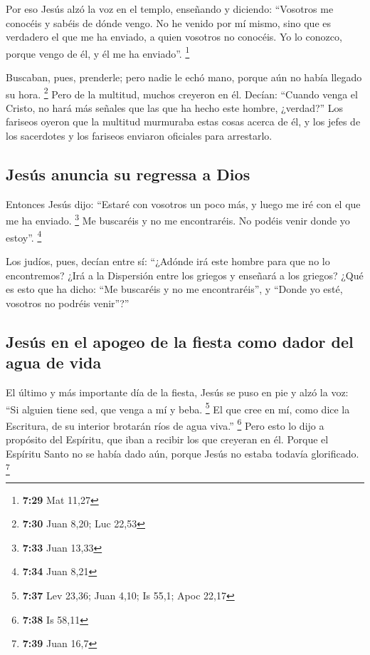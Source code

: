 \begin{paracol}{2}
 Por eso Jesús alzó la voz en el templo, enseñando y
diciendo: ``Vosotros me conocéis y sabéis de dónde vengo. No he venido
por mí mismo, sino que es verdadero el que me ha enviado, a quien
vosotros no conocéis.  Yo lo conozco, porque vengo de él,
y él me ha enviado''. \footnote{\textbf{7:29} Mat 11,27}

 Buscaban, pues, prenderle; pero nadie le echó mano,
porque aún no había llegado su hora. \footnote{\textbf{7:30} Juan 8,20;
  Luc 22,53}  Pero de la multitud, muchos creyeron en él.
Decían: ``Cuando venga el Cristo, no hará más señales que las que ha
hecho este hombre, ¿verdad?''  Los fariseos oyeron que la
multitud murmuraba estas cosas acerca de él, y los jefes de los
sacerdotes y los fariseos enviaron oficiales para arrestarlo.

\hypertarget{jesuxfas-anuncia-su-regressa-a-dios}{%
\subsection{Jesús anuncia su regressa a
Dios}\label{jesuxfas-anuncia-su-regressa-a-dios}}

 Entonces Jesús dijo: ``Estaré con vosotros un poco más,
y luego me iré con el que me ha enviado. \footnote{\textbf{7:33} Juan
  13,33}  Me buscaréis y no me encontraréis. No podéis
venir donde yo estoy''. \footnote{\textbf{7:34} Juan 8,21}

 Los judíos, pues, decían entre sí: ``¿Adónde irá este
hombre para que no lo encontremos? ¿Irá a la Dispersión entre los
griegos y enseñará a los griegos?  ¿Qué es esto que ha
dicho: ``Me buscaréis y no me encontraréis'', y ``Donde yo esté,
vosotros no podréis venir''?''

\hypertarget{jesuxfas-en-el-apogeo-de-la-fiesta-como-dador-del-agua-de-vida}{%
\subsection{Jesús en el apogeo de la fiesta como dador del agua de
vida}\label{jesuxfas-en-el-apogeo-de-la-fiesta-como-dador-del-agua-de-vida}}

 El último y más importante día de la fiesta, Jesús se
puso en pie y alzó la voz: ``Si alguien tiene sed, que venga a mí y
beba. \footnote{\textbf{7:37} Lev 23,36; Juan 4,10; Is 55,1; Apoc 22,17}
 El que cree en mí, como dice la Escritura, de su
interior brotarán ríos de agua viva.'' \footnote{\textbf{7:38} Is 58,11}
 Pero esto lo dijo a propósito del Espíritu, que iban a
recibir los que creyeran en él. Porque el Espíritu Santo no se había
dado aún, porque Jesús no estaba todavía glorificado. \footnote{\textbf{7:39}
  Juan 16,7}


\end{paracol}
